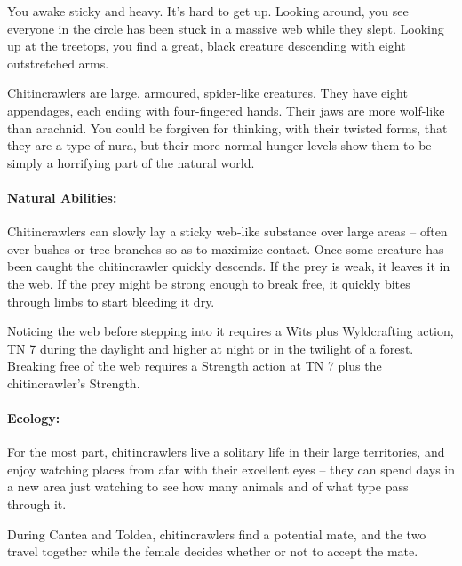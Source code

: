 \begin{multicols}{2}
\begin{itemize}
\end{itemize}


\label{chitincrawler}

\begin{boxtext}

You awake sticky and heavy.
It's hard to get up.
Looking around, you see everyone in the circle has been stuck in a massive web while they slept.
Looking up at the treetops, you find a great, black creature descending with eight outstretched arms.

\end{boxtext}

Chitincrawlers are large, armoured, spider-like creatures.
They have eight appendages, each ending with four-fingered hands.
Their jaws are more wolf-like than arachnid.
You could be forgiven for thinking, with their twisted forms, that they are a type of nura, but their more normal hunger levels show them to be simply a horrifying part of the natural world.

\chitincrawler

\paragraph{Natural Abilities:} Chitincrawlers can slowly lay a sticky web-like substance over large areas -- often over bushes or tree branches so as to maximize contact.
Once some creature has been caught the chitincrawler quickly descends.
If the prey is weak, it leaves it in the web.
If the prey might be strong enough to break free, it quickly bites through limbs to start bleeding it dry.

Noticing the web before stepping into it requires a Wits plus Wyldcrafting action, TN 7 during the daylight and higher at night or in the twilight of a forest.
Breaking free of the web requires a Strength action at TN 7 plus the chitincrawler's Strength.

\paragraph{Ecology:}
For the most part, chitincrawlers live a solitary life in their large territories, and enjoy watching places from afar with their excellent eyes -- they can spend days in a new area just watching to see how many animals and of what type pass through it.

During Cantea and Toldea, chitincrawlers find a potential mate, and the two travel together while the female decides whether or not to accept the mate.


\end{multicols}
